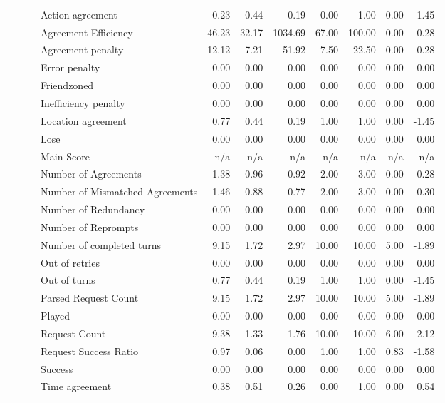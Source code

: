 \begin{tabular}{llllrrrrrrr}
 &  &  & Action agreement & 0.23 & 0.44 & 0.19 & 0.00 & 1.00 & 0.00 & 1.45 \\
 &  &  & Agreement Efficiency & 46.23 & 32.17 & 1034.69 & 67.00 & 100.00 & 0.00 & -0.28 \\
 &  &  & Agreement penalty & 12.12 & 7.21 & 51.92 & 7.50 & 22.50 & 0.00 & 0.28 \\
 &  &  & Error penalty & 0.00 & 0.00 & 0.00 & 0.00 & 0.00 & 0.00 & 0.00 \\
 &  &  & Friendzoned & 0.00 & 0.00 & 0.00 & 0.00 & 0.00 & 0.00 & 0.00 \\
 &  &  & Inefficiency penalty & 0.00 & 0.00 & 0.00 & 0.00 & 0.00 & 0.00 & 0.00 \\
 &  &  & Location agreement & 0.77 & 0.44 & 0.19 & 1.00 & 1.00 & 0.00 & -1.45 \\
 &  &  & Lose & 0.00 & 0.00 & 0.00 & 0.00 & 0.00 & 0.00 & 0.00 \\
 &  &  & Main Score & n/a & n/a & n/a & n/a & n/a & n/a & n/a \\
 &  &  & Number of Agreements & 1.38 & 0.96 & 0.92 & 2.00 & 3.00 & 0.00 & -0.28 \\
 &  &  & Number of Mismatched Agreements & 1.46 & 0.88 & 0.77 & 2.00 & 3.00 & 0.00 & -0.30 \\
 &  &  & Number of Redundancy & 0.00 & 0.00 & 0.00 & 0.00 & 0.00 & 0.00 & 0.00 \\
 &  &  & Number of Reprompts & 0.00 & 0.00 & 0.00 & 0.00 & 0.00 & 0.00 & 0.00 \\
 &  &  & Number of completed turns & 9.15 & 1.72 & 2.97 & 10.00 & 10.00 & 5.00 & -1.89 \\
 &  &  & Out of retries & 0.00 & 0.00 & 0.00 & 0.00 & 0.00 & 0.00 & 0.00 \\
 &  &  & Out of turns & 0.77 & 0.44 & 0.19 & 1.00 & 1.00 & 0.00 & -1.45 \\
 &  &  & Parsed Request Count & 9.15 & 1.72 & 2.97 & 10.00 & 10.00 & 5.00 & -1.89 \\
 &  &  & Played & 0.00 & 0.00 & 0.00 & 0.00 & 0.00 & 0.00 & 0.00 \\
 &  &  & Request Count & 9.38 & 1.33 & 1.76 & 10.00 & 10.00 & 6.00 & -2.12 \\
 &  &  & Request Success Ratio & 0.97 & 0.06 & 0.00 & 1.00 & 1.00 & 0.83 & -1.58 \\
 &  &  & Success & 0.00 & 0.00 & 0.00 & 0.00 & 0.00 & 0.00 & 0.00 \\
 &  &  & Time agreement & 0.38 & 0.51 & 0.26 & 0.00 & 1.00 & 0.00 & 0.54 \\

\end{tabular}
